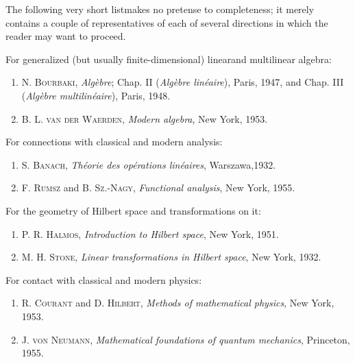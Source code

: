 
The following very short listmakes no pretense to completeness; it merely
contains a couple of representatives of each of several directions in which the
reader may want to proceed.

\bigskip

For generalized (but usually finite-dimensional) linearand multilinear algebra:
\begin{enumerate}[nosep]
    \item N. {\scshape Bourbaki}, \emph{Algèbre}; Chap. II (\emph{Algèbre linéaire}), Paris, 1947, and Chap. III (\emph{Algèbre multilinéaire}), Paris, 1948.
    \item B. L. {\scshape van der Waerden}, \emph{Modern algebra}, New York, 1953.
\end{enumerate}

\medskip

For connections with classical and modern analysis:
\begin{enumerate}[nosep]
    \item S. {\scshape Banach}, \emph{Théorie des opérations linéaires}, Warszawa,1932.
    \item F. {\scshape Rumsz} and B. {\scshape Sz.-Nagy}, \emph{Functional analysis}, New York, 1955.
\end{enumerate}

\medskip

For the geometry of Hilbert space and transformations on it:
\begin{enumerate}[nosep]
    \item P. R. {\scshape Halmos}, \emph{Introduction to Hilbert space}, New York, 1951.
    \item M. H. {\scshape Stone}, \emph{Linear transformations in Hilbert space}, New York, 1932.
\end{enumerate}

\medskip

For contact with classical and modern physics:
\begin{enumerate}[nosep]
    \item R. {\scshape Courant} and D. {\scshape Hilbert}, \emph{Methods of mathematical physics}, New York, 1953. 
    \item J. {\scshape von Neumann}, \emph{Mathematical foundations of quantum mechanics}, Princeton, 1955.
\end{enumerate}